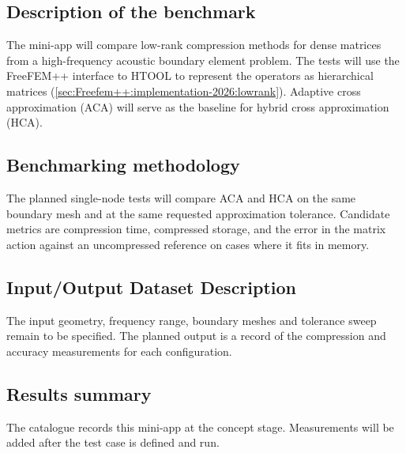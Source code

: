 \label{sec:app:specs:app-freefem-lowrank}



\subsection{Description of the benchmark}

The mini-app will compare low-rank compression methods for dense matrices
from a high-frequency acoustic boundary element problem. The tests will
use the FreeFEM++ interface to HTOOL to represent the operators as
hierarchical matrices (\cref{sec:Freefem++:implementation-2026:lowrank}).
Adaptive cross approximation (ACA) will serve as the baseline for hybrid
cross approximation (HCA).

\subsection{Benchmarking methodology}

The planned single-node tests will compare ACA and HCA on the same boundary
mesh and at the same requested approximation tolerance. Candidate metrics
are compression time, compressed storage, and the error in the matrix
action against an uncompressed reference on cases where it fits in memory.

\subsection{Input/Output Dataset Description}

The input geometry, frequency range, boundary meshes and tolerance sweep
remain to be specified. The planned output is a record of the compression
and accuracy measurements for each configuration.

\subsection{Results summary}

The catalogue records this mini-app at the concept stage. Measurements
will be added after the test case is defined and run.
